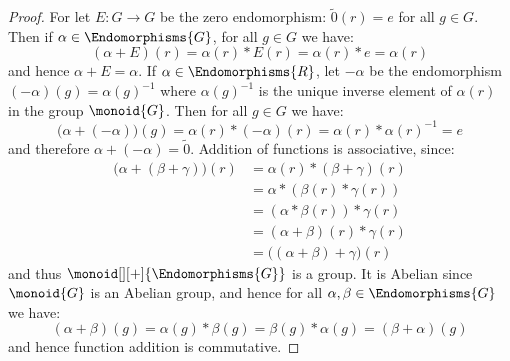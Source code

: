             \begin{proof}
                For let $E:G\rightarrow{G}$ be the zero
                endomorphism: $\tilde{0}(r)=e$ for all $g\in{G}$. Then if
                $\alpha\in\Endomorphisms{G}$, for all $g\in{G}$ we have:
                \begin{equation}
                    (\alpha+E)(r)=\alpha(r)*E(r)=\alpha(r)*e=\alpha(r)
                \end{equation}
                and hence $\alpha+E=\alpha$. If
                $\alpha\in\Endomorphisms{R}$, let $\minus{\alpha}$ be the
                endomorphism $(\minus\alpha)(g)=\alpha(g)^{\minus{1}}$
                where $\alpha(g)^{\minus{1}}$ is the unique inverse element
                of $\alpha(r)$ in the group $\monoid{G}$. Then for all
                $g\in{G}$ we have:
                \begin{equation}
                    \big(\alpha+(\minus{\alpha})\big)(g)
                    =\alpha(r)*(\minus\alpha)(r)
                    =\alpha(r)*\alpha(r)^{\minus{1}}
                    =e
                \end{equation}
                and therefore $\alpha+(\minus{\alpha})=\tilde{0}$. Addition
                of functions is associative, since:
                \begin{subequations}
                    \begin{align}
                        \big(\alpha+(\beta+\gamma)\big)(r)
                        &=\alpha(r)*(\beta+\gamma)(r)\\
                        &=\alpha*(\beta(r)*\gamma(r))\\
                        &=(\alpha*\beta(r))*\gamma(r)\\
                        &=(\alpha+\beta)(r)*\gamma(r)\\
                        &=\big((\alpha+\beta)+\gamma\big)(r)
                    \end{align}
                \end{subequations}
                and thus $\monoid[][+]{\Endomorphisms{G}}$ is a group. It is
                Abelian since $\monoid{G}$ is an Abelian group, and hence
                for all $\alpha,\beta\in\Endomorphisms{G}$ we have:
                \begin{equation}
                    (\alpha+\beta)(g)=\alpha(g)*\beta(g)
                        =\beta(g)*\alpha(g)
                        =(\beta+\alpha)(g)
                \end{equation}
                and hence function addition is commutative.
            \end{proof}
